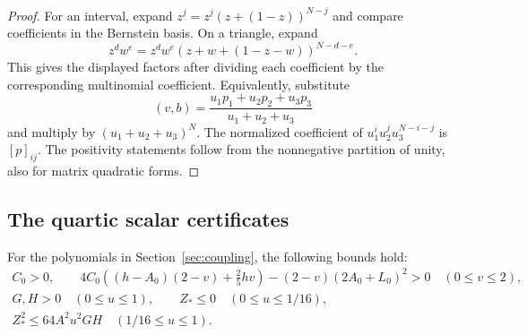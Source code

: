 \begin{proof}
For an interval, expand
$z^j=z^j(z+(1-z))^{N-j}$ and compare coefficients in the Bernstein
basis. On a triangle, expand
\[
 z^dw^e=z^dw^e(z+w+(1-z-w))^{N-d-e}.
\]
This gives the displayed factors after dividing each coefficient by the
corresponding multinomial coefficient. Equivalently, substitute
\[
 (v,b)=\frac{u_1p_1+u_2p_2+u_3p_3}{u_1+u_2+u_3}
\]
and multiply by $(u_1+u_2+u_3)^N$. The normalized coefficient of
$u_1^iu_2^ju_3^{N-i-j}$ is $[p]_{ij}$. The positivity statements
follow from the nonnegative partition of unity, also for matrix
quadratic forms.
\end{proof}

\subsection{The quartic scalar certificates}

\begin{lemma}\label{lem:scalar-certificates}
For the polynomials in Section~\ref{sec:coupling}, the following bounds
hold:
\[
\begin{gathered}
 C_0>0,\qquad
 4C_0\left((h-A_0)(2-v)+\frac25hv\right)
       -(2-v)(2A_0+L_0)^2>0\quad(0\le v\le2),\\
 G,H>0\quad(0\le u\le1),\qquad
 Z_*\le0\quad(0\le u\le1/16),\\
 Z_*^2\le64A^2u^2GH\quad(1/16\le u\le1).
\end{gathered}
\]
\end{lemma}


